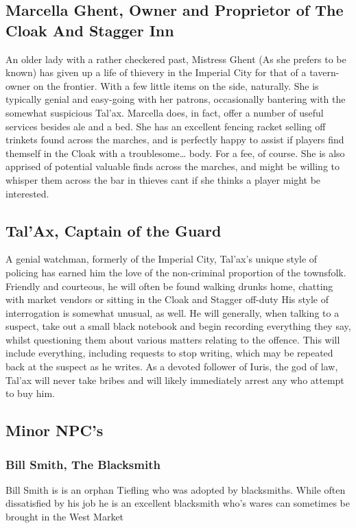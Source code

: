 \subsection{Marcella Ghent, Owner and Proprietor of The Cloak And Stagger Inn}
An older lady with a rather checkered past, Mistress Ghent (As she prefers to be known) has given up a life of thievery in the Imperial City for that of a tavern-owner on the frontier. With a few little items on the side, naturally. She is typically genial and easy-going with her patrons, occasionally bantering with the somewhat suspicious Tal’ax. 
\newline
Marcella does, in fact, offer a number of useful services besides ale and a bed. She has an excellent fencing racket selling off trinkets found across the marches, and is perfectly happy to assist if players find themself in the Cloak with a troublesome… body. For a fee, of course. 
\newline
She is also apprised of potential valuable finds across the marches, and might be willing to whisper them across the bar in thieves cant if she thinks a player might be interested.  

\subsection{Tal'Ax, Captain of the Guard}
A genial watchman, formerly of the Imperial City, Tal’ax’s unique style of policing has earned him the love of the non-criminal proportion of the townsfolk. Friendly and courteous, he will often be found walking drunks home, chatting with market vendors or sitting in the Cloak and Stagger off-duty
\newline
His style of interrogation is somewhat unusual, as well. He will generally, when talking to a suspect, take out a small black notebook and begin recording everything they say, whilst questioning them about various matters relating to the offence. This will include everything, including requests to stop writing, which may be repeated back at the suspect as he writes. 
\newline
As a devoted follower of Iuris, the god of law, Tal’ax will never take bribes and will likely immediately arrest any who attempt to buy him.
\subsection{Minor NPC's}
\subsubsection{Bill Smith, The Blacksmith}
Bill Smith is is an orphan Tiefling who was adopted by blacksmiths. While often dissatisfied by his job he is an excellent blacksmith who's wares can sometimes be brought in the West Market
